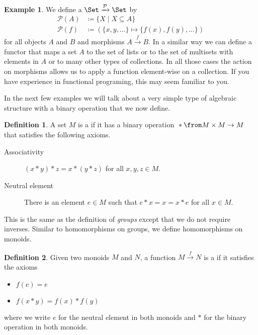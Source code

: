 \documentclass{article}
\theoremstyle{definition}
\newtheorem{definition}{Definition}
\newtheorem{example}{Example}
\begin{document}
\begin{example}
  We define a  $\Set \xrightarrow{\mathcal{P}} \Set$ by
  \begin{align*}
    \mathcal{P}(A) &\coloneqq \{ X \mid X \subseteq A \} \\
    \mathcal{P}(f) &\coloneqq (\{x, y, \ldots\} \mapsto \{f(x), f(y), \ldots\})
  \end{align*}
  for all objects $A$ and $B$ and morphisms $A \xrightarrow{f} B$.
  In a similar way we can define a functor that maps a set $A$ to the set of lists or to the set of multisets with elements in $A$ or to many other types of collections.
  In all those cases the action on morphisms allows us to apply a function element-wise on a collection.
  If you have experience in functional programing, this may seem familiar to you.
\end{example}

In the next few examples we will talk about a very simple type of algebraic structure with a binary operation that we now define.

\begin{definition}
  A set $M$ is a  if it has a binary operation ${}*{} \from M \times M \to M$ that satisfies the following axioms.
  \begin{description}
    \item [Associativity] $(x * y) * z = x * (y * z)$ for all $x, y, z \in M$.
    \item [Neutral element] There is an element $e \in M$ such that $e * x = x = x * e$ for all $x \in M$.
  \end{description}
\end{definition}

This is the same as the definition of \emph{groups} except that we do not require inverses.
Similar to homomorphisms on groups, we define homomorphisms on monoids.

\begin{definition}
  Given two monoids $M$ and $N$, a function $M \xrightarrow{f} N$ is a  if it satisfies the axioms
  \begin{itemize}
    \item $f(e) = e$
    \item $f(x * y) = f(x) * f(y)$
  \end{itemize}
  where we write $e$ for the neutral element in both monoids and $*$ for the binary operation in both monoids.
\end{definition}
\end{document}
